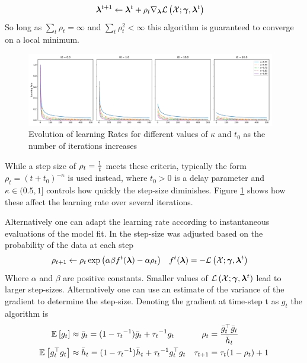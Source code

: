 \begin{align}
{  \bm \lambda  }^{t+1} & \leftarrow {  \bm \lambda  }^t + \rho_t \nabla_{ \bm \lambda }{ \mathcal{L}\left({ \mathcal{X} }; \bm \gamma, { \bm \lambda }^{{t}} \right) }
\end{align}
So long as $\sum_t \rho_t = \infty$ and $\sum_t \rho^2_t < \infty$ this algorithm is guaranteed to converge on a local minimum\cite{RobbinsMonro1951}.

\begin{figure}
  \centering
    \includegraphics[width=0.97\textwidth]{../Chap1/plots/learning_rate.pdf}
  \caption{Evolution of learning Rates for different values of $\kappa$ and $t_0$ as the number of iterations increases}
  \label{fig:learning-rates}
\end{figure}

While a step size of $\rho_t = \frac{1}{ {t} }$ meets these criteria, typically\cite{Gopalan2013}\cite{Hoffman2012}\cite{Hoffman2010} the form $\rho_t = (t + t_0)^{-\kappa}$ is used instead, where $t_0 > 0$ is a delay parameter and $\kappa \in (0.5,1]$ controls how quickly the step-size diminishes. Figure \ref{fig:learning-rates} shows how these affect the learning rate over several iterations.

Alternatively one can adapt the learning rate according to instantaneous evaluations of the model fit. In \cite{Amari1998} the step-size was adjusted based on the probability of the data at each step
\begin{align}
\rho_{t+1} & \leftarrow  \rho_t \exp\left( \alpha\beta f^t({ \bm \lambda })  - \alpha\rho_t \right) & f^t({ \bm \lambda }) &= -{ \mathcal{L}\left({ \mathcal{X} }; \bm \gamma, { \bm \lambda }^{{t}} \right) }
\end{align}
Where  $\alpha$ and $\beta$ are positive constants. Smaller values of ${ \mathcal{L}\left({ \mathcal{X} }; \bm \gamma, { \bm \lambda }^{{t}} \right) }$ lead to larger step-sizes. Alternatively one can use an estimate of the variance of the gradient\cite{Ho2012} to determine the step-size. Denoting the gradient at time-step t as $g_t$ the algorithm is
\begin{align}
\mathbb{E}_{ {  } }\left[ g_t \right] & \approx \bar{g}_t = (1 - {\tau_t}^{-1})\bar{g}_t + {\tau_t}^{-1}g_t 
& \rho_t & = \frac{\bar{g}_t ^\top \bar{g}_t}{\bar{h}_t} \\
\mathbb{E}_{ {  } }\left[ g_t ^\top g_t \right] & \approx \bar{h}_t = (1 - {\tau_t}^{-1})\bar{h}_t + {\tau_t}^{-1}g_t^\top g_t &
\tau_{t+1} & = \tau_t(1 - \rho_t) + 1
\end{align}

